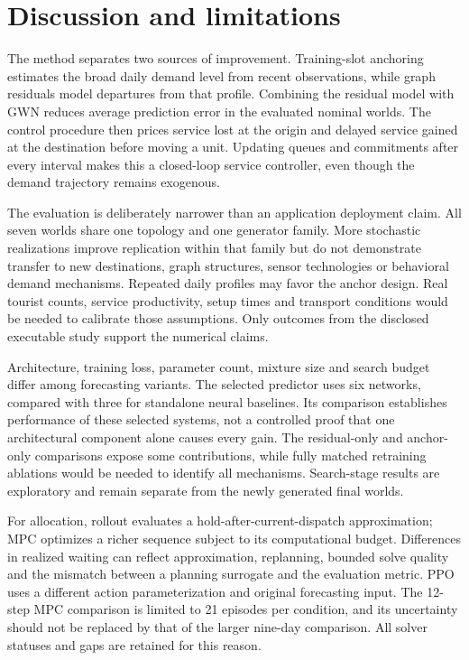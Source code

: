 \TimingInterpretation\par
\FloatBarrier

\section{Discussion and limitations}
The method separates two sources of improvement. Training-slot anchoring estimates the broad daily demand level from recent observations, while graph residuals model departures from that profile. Combining the residual model with GWN reduces average prediction error in the evaluated nominal worlds. The control procedure then prices service lost at the origin and delayed service gained at the destination before moving a unit. Updating queues and commitments after every interval makes this a closed-loop service controller, even though the demand trajectory remains exogenous.

The evaluation is deliberately narrower than an application deployment claim. All seven worlds share one topology and one generator family. More stochastic realizations improve replication within that family but do not demonstrate transfer to new destinations, graph structures, sensor technologies or behavioral demand mechanisms. Repeated daily profiles may favor the anchor design. Real tourist counts, service productivity, setup times and transport conditions would be needed to calibrate those assumptions. Only outcomes from the disclosed executable study support the numerical claims.

Architecture, training loss, parameter count, mixture size and search budget differ among forecasting variants. The selected predictor uses six networks, compared with three for standalone neural baselines. Its comparison establishes performance of these selected systems, not a controlled proof that one architectural component alone causes every gain. The residual-only and anchor-only comparisons expose some contributions, while fully matched retraining ablations would be needed to identify all mechanisms. Search-stage results are exploratory and remain separate from the newly generated final worlds.

For allocation, rollout evaluates a hold-after-current-dispatch approximation; MPC optimizes a richer sequence subject to its computational budget. Differences in realized waiting can reflect approximation, replanning, bounded solve quality and the mismatch between a planning surrogate and the evaluation metric. PPO uses a different action parameterization and original forecasting input. The 12-step MPC comparison is limited to 21 episodes per condition, and its uncertainty should not be replaced by that of the larger nine-day comparison. All solver statuses and gaps are retained for this reason.

